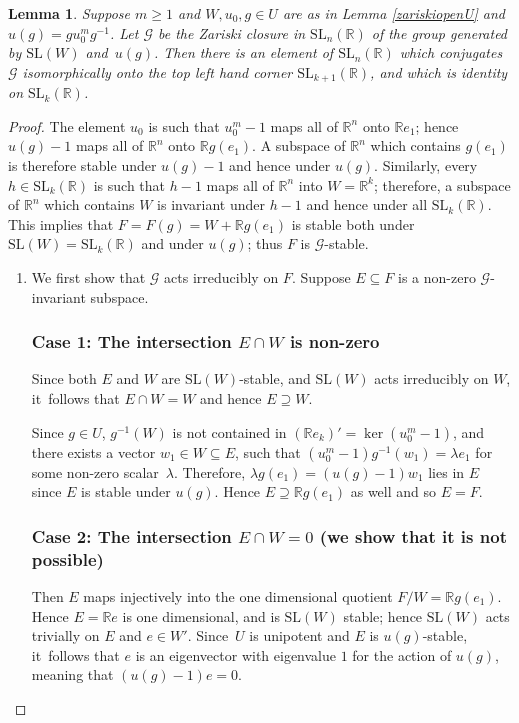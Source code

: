 \documentclass[JEP,XML,SOM,Unicode,published]{cedram}
\newtheorem{lemma}{Lemma}
\theoremstyle{definition}
\newcommand{\field}[1]{\mathbb{#1}}
\newcommand{\R}{\field{R}}
\newcommand{\SL}{\mathrm{SL}}
\let\l\lambda
\begin{document}
\begin{lemma}\label{SL(k+1)} Suppose $m\geq 1$ and $W, u_0,g\in U$ are as in Lemma \ref{zariskiopenU} and $u(g)=gu_0^mg^{-1}$. Let $\mathcal G$ be the Zariski closure in $\SL_n(\R)$ of the group generated by $\SL(W)$ and~$u(g)$. Then there is an element of $\SL_n(\R)$ which conjugates $\mathcal G$ \emph{isomorphically onto} the top left hand corner $\SL_{k+1}(\R)$, and which is identity on $\SL_k(\R)$.
\end{lemma}

\begin{proof}
The element $u_0$ is such that $u_0^m -1$ maps all of $\R ^n$ onto $\R e_1$; hence $u(g)-1$ maps all of $\R ^n$ onto $\R g(e_1)$. A subspace of $\R^n$ which contains $g(e_1)$ is therefore stable under $u(g)-1$ and hence under $u(g)$. Similarly, every $h\in \SL_k(\R)$ is such that $h-1$ maps all of $\R ^n$ into $W=\R ^k$; therefore, a subspace of $\R ^n$ which contains $W$ is invariant under $h-1$ and hence under all $\SL_k(\R)$. This implies that $F=F(g)= W+ \R g(e_1)$ is stable both under $\SL(W)=\SL_k(\R)$ and under $u(g)$; thus $F$ is $\mathcal G$-stable.

\begin{enumerate}
\item
We first show that $\mathcal G$ acts irreducibly on $F$. Suppose $E\subseteq F$ is a non-zero $\mathcal G$-invariant subspace.

\subsubsection*{Case 1: The intersection $E\cap W$ is non-zero}
Since both $E$ and $W$ are $\SL(W)$-stable, and $\SL(W)$ acts irreducibly on $W$, it~follows that $E\cap W=W$ and hence $E\supseteq W$.

Since $g\in U$, $g^{-1}(W)$ is not contained in $(\R e_k)' =\ker (u_0^m-1)$, and there exists a vector $w_1\in W\subseteq E$, such that $(u_0^m-1)g^{-1}(w_1) =\l e_1$ for some non-zero scalar~$\l$. Therefore, $\l g(e_1)=(u(g)-1)w_1$ lies in $E$ since $E$ is stable under $u(g)$. Hence $E\supseteq \R g(e_1)$ as well and so $E=F$.

\subsubsection*{Case 2: The intersection $E\cap W=0$ (we show that it is not possible)}
Then $E$ maps injectively into the one dimensional quotient $F/W=\R g(e_1)$. Hence $E=\R e$ is one dimensional, and is $\SL(W)$ stable; hence $\SL(W)$ acts trivially on $E$ and $e\in W'$. Since~$U$ is unipotent and $E$ is $u(g)$-stable, it~follows that $e$ is an eigenvector with eigenvalue $1$ for the action of $u(g)$, meaning that $(u(g)-1)e=0$.


\end{enumerate}
\end{proof}
\end{document}
